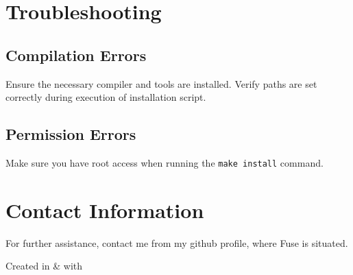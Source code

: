 \documentclass[a4paper,12pt]{article}
\begin{document}
\section{Troubleshooting}
\subsection{Compilation Errors}
Ensure the necessary compiler and tools are installed. Verify paths are set correctly during execution of installation script.

\subsection{Permission Errors}
Make sure you have root access when running the \texttt{make install} command.

\section{Contact Information}
For further assistance, contact me from my github profile, where Fuse is situated.

\vspace{\fill}

\begin{center}Created in  \& 
	with \end{center}
\end{document}
